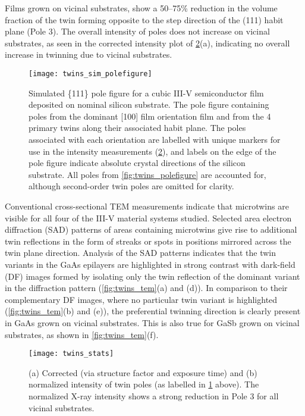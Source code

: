 Films grown on vicinal substrates, show a 50--75\% reduction in the volume fraction of the twin forming opposite to the step direction of the (111) habit plane (Pole 3).
The overall intensity of poles does not increase on vicinal substrates, as seen in the corrected intensity plot of \cref{fig:twins_stats}(a), indicating no overall increase in twinning due to vicinal substrates.
\begin{figure}
 \centering \texttt{[image: twins\_sim\_polefigure]}
 \caption[Simulated pole figure of twinned III-V on nominal silicon]{\label{fig:twins_sim_polefigure}Simulated \{111\} pole figure for a cubic III-V semiconductor film deposited on nominal silicon substrate.
  The pole figure containing poles from the dominant [100] film orientation film and from the 4 primary twins along their associated habit plane.
  The poles associated with each orientation are labelled with unique markers for use in the intensity measurements (\cref{fig:twins_stats}), and labels on the edge of the pole figure indicate absolute crystal directions of the silicon substrate.
  All poles from \cref{fig:twins_polefigure} are accounted for, although second-order twin poles are omitted for clarity.}
\end{figure}
Conventional cross-sectional TEM measurements indicate that microtwins are visible for all four of the III-V material systems studied.
Selected area electron diffraction (SAD) patterns of areas containing microtwins give rise to additional twin reflections in the form of streaks or spots in positions mirrored across the twin plane direction.
Analysis of the SAD patterns indicates that the twin variants in the GaAs epilayers are highlighted in strong contrast with dark-field (DF) images formed by isolating only the twin reflection of the dominant variant in the diffraction pattern (\cref{fig:twins_tem}(a) and (d)).
In comparison to their complementary DF images, where no particular twin variant is highlighted (\cref{fig:twins_tem}(b) and (e)), the preferential twinning direction is clearly present in GaAs grown on vicinal substrates.
This is also true for GaSb grown on vicinal substrates, as shown in \cref{fig:twins_tem}(f).
\begin{figure}
 \centering \texttt{[image: twins\_stats]}
 \caption[Integrated x-ray intensities from pole figures]{\label{fig:twins_stats}(a) Corrected (via structure factor and exposure time) and (b) normalized intensity of twin poles (as labelled in \cref{fig:twins_sim_polefigure} above).
  The normalized X-ray intensity shows a strong reduction in Pole 3 for all vicinal substrates.}
\end{figure}
